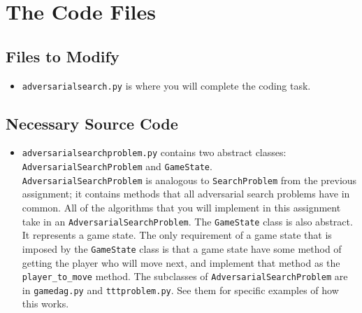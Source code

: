 \documentclass{article}
\begin{document}
\section{The Code Files}
\subsection{Files to Modify}
\begin{itemize}
    \item \verb|adversarialsearch.py| is where you will complete the coding task.
\end{itemize}

\subsection{Necessary Source Code}
\begin{itemize}
    
    \item \verb|adversarialsearchproblem.py| contains two abstract classes: \\
    \verb|AdversarialSearchProblem| and \verb|GameState|. \\
    \verb|AdversarialSearchProblem| is analogous to \verb|SearchProblem| from the previous assignment; it contains methods that all adversarial search problems have in common.
    All of the algorithms that you will implement in this assignment take in an \verb|AdversarialSearchProblem|.
    The \verb|GameState| class is also abstract.
    It represents a game state.
    The only requirement of a game state that is imposed by the \verb|GameState| class is that a game state have some method of getting the player who will move next, and implement that method as the \verb|player_to_move| method. 
    The subclasses of \verb|AdversarialSearchProblem| are in \verb|gamedag.py| and \verb|tttproblem.py|.
    See them for specific examples of how this works.
\end{itemize}
\end{document}
